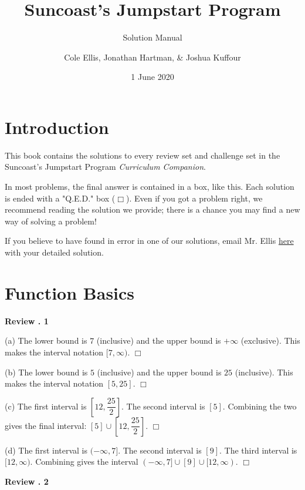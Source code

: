 \documentclass[lang=en,11pt]{elegantbook}
\title{Suncoast's Jumpstart Program}
\subtitle{Solution Manual}
\author{Cole Ellis, Jonathan Hartman, \& Joshua Kuffour}
\institute{Suncoast High School}
\date{1 June 2020}
\begin{document}
\maketitle

\frontmatter
\tableofcontents

\mainmatter


\chapter{Introduction}
This book contains the solutions to every review set and challenge set in the Suncoast's Jumpstart Program \textit{Curriculum Companion}.

In most problems, the final answer is contained in a box, $\boxed{\text{like this}}$.  Each solution is ended with a "Q.E.D." box ($\Box$).  Even if you got a problem right, we recommend reading the solution we provide; there is a chance you may find a new way of solving a problem!  

If you believe to have found in error in one of our solutions, email Mr. Ellis  \href{mailto:educationelite1@gmail.com}{here} with your detailed solution.
\chapter{Function Basics}
\noindent \textbf{Review . 1}

(a) The lower bound is $7$ (inclusive) and the upper bound is $+\infty$ (exclusive).  This makes the interval notation $\boxed{[7,\infty)}$. $\Box$

(b) The lower bound is $5$ (inclusive) and the upper bound is $25$ (inclusive).  This makes the interval notation $\boxed{\left[5,25\right]}$. $\Box$

(c) The first interval is $\left[12,\dfrac{25}{2}\right]$.  The second interval is $[5]$.  Combining the two gives the final interval: $\boxed{[5] \cup \left[12,\dfrac{25}{2}\right]}$. $\Box$

(d) The first interval is $(-\infty,7]$.  The second interval is $[9]$.  The third interval is $[12,\infty)$.  Combining gives the interval $\boxed{(-\infty,7] \cup [9] \cup [12,\infty)}$. $\Box$\vspace{3mm}

\noindent \textbf{Review . 2}
\end{document}
